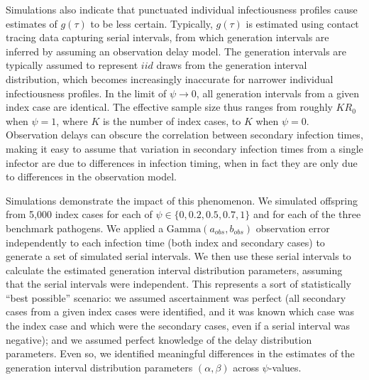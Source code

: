 


Simulations also indicate that punctuated individual infectiousness profiles cause estimates of $g(\tau)$ to be less certain. Typically, $g(\tau)$ is estimated using contact tracing data capturing serial intervals, from which generation intervals are inferred by assuming an observation delay model. The generation intervals are typically assumed to represent $iid$ draws from the generation interval distribution, which becomes increasingly inaccurate for narrower individual infectiousness profiles. In the limit of $\psi \rightarrow 0$, all generation intervals from a given index case are identical. The effective sample size thus ranges from roughly $K R_0$ when $\psi = 1$, where $K$ is the number of index cases, to $K$ when $\psi = 0$. Observation delays can obscure the correlation between secondary infection times, making it easy to assume that variation in secondary infection times from a single infector are due to differences in infection timing, when in fact they are only due to differences in the observation model. 

Simulations demonstrate the impact of this phenomenon. We simulated offspring from 5,000 index cases for each of $\psi \in \{0, 0.2, 0.5, 0.7, 1\}$ and for each of the three benchmark pathogens. We applied a $\text{Gamma}(a_{obs}, b_{obs})$ observation error independently to each infection time (both index and secondary cases) to generate a set of simulated serial intervals. We then use these serial intervals to calculate the estimated generation interval distribution parameters, assuming that the serial intervals were independent. This represents a sort of statistically ``best possible'' scenario: we assumed ascertainment was perfect (all secondary cases from a given index cases were identified, and it was known which case was the index case and which were the secondary cases, even if a serial interval was negative); and we assumed perfect knowledge of the delay distribution parameters. Even so, we identified meaningful differences in the estimates of the generation interval distribution parameters $(\alpha, \beta)$ across $\psi$-values. 

